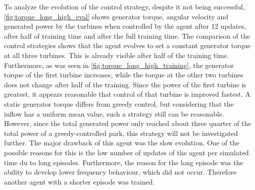 To analyze the evolution of the control strategy, despite it not being successful, \autoref{fig:torque_long_high_eval} shows generator torque, angular velocity and generated power by the turbines when controlled by the agent after 12 updates, after half of training time and after the full training time. The comparison of the control strategies shows that the agent evolves to set a constant generator torque at all three turbines. This is already visible after half of the training time. Furthermore, as was seen in \autoref{fig:torque_long_high_training}, the generator torque of the first turbine increases, while the torque at the other two turbines does not change after half of the training. Since the power of the first turbine is greatest, it appears reasonable that control of that turbine is improved fastest. A static generator torque differs from greedy control, but considering that the inflow has a uniform mean value, such a strategy still can be reasonable. However, since the total generated power only reached about three quarter of the total power of a greedy-controlled park, this strategy will not be investigated further. The major drawback of this agent was the slow evolution. One of the possible reasons for this is the low number of updates of the agent per simulated time du to long episodes. Furthermore, the reason for the long episode was the ability to develop lower frequency behaviour, which did not occur. Therefore another agent with a shorter episode  was trained. \newpage
